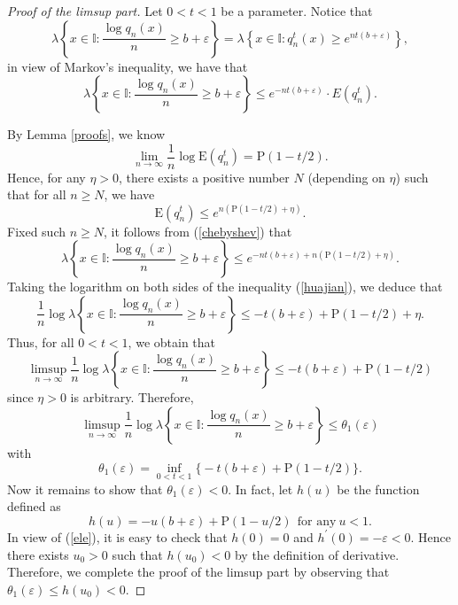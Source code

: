 \documentclass[reqno]{amsart}
\theoremstyle{definition}
\numberwithin{equation}{section}
\begin{document}
\begin{proof}[Proof of the limsup part]
Let $0<t<1$ be a parameter. Notice that
\begin{equation*}
\lambda \left\{x \in \mathbb{I}:\frac{\log q_n(x)}{n} \geq b + \varepsilon\right\} = \lambda \left\{x \in \mathbb{I}: q_n^{t}(x) \geq e^{nt(b + \varepsilon)}\right\},
\end{equation*}
in view of Markov's inequality, we have that
\begin{equation}\label{chebyshev}
\lambda \left\{x \in \mathbb{I}: \frac{\log q_n(x)}{n} \geq b + \varepsilon\right\} \leq e^{-nt(b+ \varepsilon)}\cdot E\left(q_n^{t}\right).
\end{equation}

By Lemma \ref{proofs}, we know
\[
\lim_{n \to \infty}\frac{1}{n} \log \mathrm{E}\left(q_n^{t}\right)= \mathrm{P}(1-t/2).
\]
Hence, for any $\eta >0$, there exists a positive number $N$ (depending on $\eta$) such that for all $n \geq N$, we have
\[
\mathrm{E}\left(q_n^{t}\right) \leq e^{n(\mathrm{P}(1-t/2) + \eta)}.
\]
Fixed such $n \geq N$, it follows from (\ref{chebyshev}) that
\begin{equation}\label{huajian}
\lambda \left\{x \in \mathbb{I}: \frac{\log q_n(x)}{n} \geq b + \varepsilon\right\} \leq e^{-nt(b+ \varepsilon)+n(\mathrm{P}(1-t/2) + \eta)}.
\end{equation}
Taking the logarithm on both sides of the inequality (\ref{huajian}), we deduce that
\begin{equation*}
\frac{1}{n}\log \lambda \left\{x \in \mathbb{I}: \frac{\log q_n(x)}{n} \geq b + \varepsilon\right\} \leq - t(b + \varepsilon) + \mathrm{P}(1-t/2) + \eta.
\end{equation*}
Thus, for all $0<t<1$, we obtain that
\begin{equation*}
\limsup_{n \to \infty} \frac{1}{n}\log \lambda \left\{x \in \mathbb{I}: \frac{\log q_n(x)}{n} \geq b + \varepsilon\right\} \leq -t(b + \varepsilon) + \mathrm{P}(1-t/2)
\end{equation*}
since $\eta >0$ is arbitrary.
Therefore,
\begin{equation*}
\limsup_{n \to \infty} \frac{1}{n}\log \lambda \left\{x \in \mathbb{I}: \frac{\log q_n(x)}{n} \geq b + \varepsilon\right\} \leq \theta_1(\varepsilon)
\end{equation*}
with
\[
\theta_1(\varepsilon) = \inf_{0< t < 1} \big\{-t(b + \varepsilon) + \mathrm{P}(1-t/2)\big \}.
\]
Now it remains to show that $\theta_1(\varepsilon) < 0$. In fact, let $h(u)$ be the function defined as
\[
h(u) = -u(b + \varepsilon) + \mathrm{P}(1-u/2)\ \ \text{for any}\ u <1 .
\]
In view of (\ref{ele}), it is easy to check that $h(0) = 0$ and $h^{\prime}(0) = -\varepsilon < 0$. Hence there exists $u_0 >0$ such that $h(u_0) < 0$ by the definition of derivative. Therefore, we complete the proof of the limsup part by observing that $\theta_1(\varepsilon) \leq h(u_0) < 0$.
\end{proof}
\end{document}

